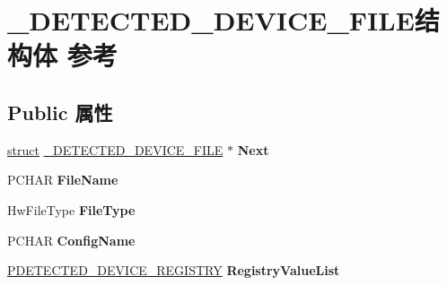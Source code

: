 \hypertarget{struct___d_e_t_e_c_t_e_d___d_e_v_i_c_e___f_i_l_e}{}\section{\+\_\+\+D\+E\+T\+E\+C\+T\+E\+D\+\_\+\+D\+E\+V\+I\+C\+E\+\_\+\+F\+I\+L\+E结构体 参考}
\label{struct___d_e_t_e_c_t_e_d___d_e_v_i_c_e___f_i_l_e}
\subsection*{Public 属性}
\begin{DoxyCompactItemize}
\item 
\mbox{\label{struct___d_e_t_e_c_t_e_d___d_e_v_i_c_e___f_i_l_e_a6ffa37789923d124987dc02012d5d37b}} 
\hyperlink{interfacestruct}{struct} \hyperlink{struct___d_e_t_e_c_t_e_d___d_e_v_i_c_e___f_i_l_e}{\+\_\+\+D\+E\+T\+E\+C\+T\+E\+D\+\_\+\+D\+E\+V\+I\+C\+E\+\_\+\+F\+I\+LE} $\ast$ {\bfseries Next}
\item 
\mbox{\label{struct___d_e_t_e_c_t_e_d___d_e_v_i_c_e___f_i_l_e_a1da642abd21411cfa568d9bf59ea7034}} 
P\+C\+H\+AR {\bfseries File\+Name}
\item 
\mbox{\label{struct___d_e_t_e_c_t_e_d___d_e_v_i_c_e___f_i_l_e_a846e5cc3815ca00bd8a8f58f5be07867}} 
Hw\+File\+Type {\bfseries File\+Type}
\item 
\mbox{\label{struct___d_e_t_e_c_t_e_d___d_e_v_i_c_e___f_i_l_e_ab91b7133c0c6b91dca19ae0c6f5ed950}} 
P\+C\+H\+AR {\bfseries Config\+Name}
\item 
\mbox{\label{struct___d_e_t_e_c_t_e_d___d_e_v_i_c_e___f_i_l_e_a545efaa22eebfe5cdf78ecb5a88bf537}} 
\hyperlink{struct___d_e_t_e_c_t_e_d___d_e_v_i_c_e___r_e_g_i_s_t_r_y}{P\+D\+E\+T\+E\+C\+T\+E\+D\+\_\+\+D\+E\+V\+I\+C\+E\+\_\+\+R\+E\+G\+I\+S\+T\+RY} {\bfseries Registry\+Value\+List}
\item 
\mbox{\label{struct___d_e_t_e_c_t_e_d___d_e_v_i_c_e___f_i_l_e_a83609dda8772aa4b64cb6320898833ec}} 

\end{DoxyCompactItemize}
